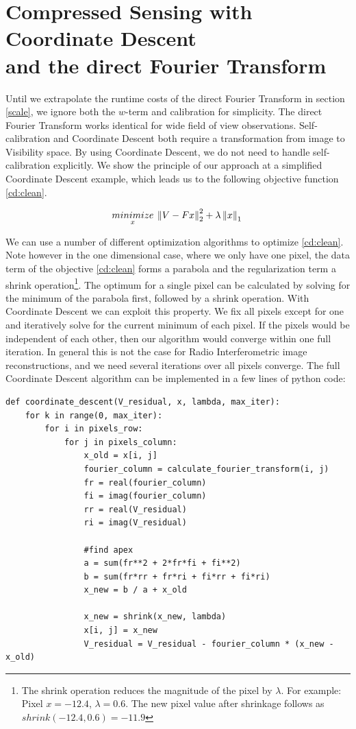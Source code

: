 \section{Compressed Sensing with Coordinate Descent\\ and the direct Fourier Transform}\label{cd}
Until we extrapolate the runtime costs of the direct Fourier Transform in section \ref{scale}, we ignore both the $w$-term and calibration for simplicity. The direct Fourier Transform works identical for wide field of view observations. Self-calibration and Coordinate Descent both require a transformation from image to Visibility space. By using Coordinate Descent, we do not need to handle self-calibration explicitly. We show the principle of our approach at a simplified Coordinate Descent example, which leads us to the following objective function \eqref{cd:clean}.

\begin{equation}\label{cd:clean}
\underset{x}{minimize} \: \left \| V - Fx \right \|_2^2 + \lambda \left \| x \right \|_1 \\
\end{equation}

We can use a number of different optimization algorithms to optimize \eqref{cd:clean}. Note however in the one dimensional case, where we only have one pixel, the data term of the objective \eqref{cd:clean} forms a parabola and the regularization term a shrink operation\footnote{The shrink operation reduces the magnitude of the pixel by $\lambda$. For example: Pixel $x = -12.4$, $\lambda = 0.6$. The new pixel value after shrinkage follows as $shrink(-12.4, 0.6) = -11.9$}. The optimum for a single pixel can be calculated by solving for the minimum of the parabola first, followed by a shrink operation. With Coordinate Descent we can exploit this property. We fix all pixels except for one and iteratively solve for the current minimum of each pixel. If the pixels would be independent of each other, then our algorithm would converge within one full iteration. In general this is not the case for Radio Interferometric image reconstructions, and we need several iterations over all pixels converge. The full Coordinate Descent algorithm can be implemented in a few lines of python code:

\begin{lstlisting} 
def coordinate_descent(V_residual, x, lambda, max_iter):
	for k in range(0, max_iter):
		for i in pixels_row:
			for j in pixels_column:
				x_old = x[i, j]
				fourier_column = calculate_fourier_transform(i, j)
				fr = real(fourier_column)
				fi = imag(fourier_column)
				rr = real(V_residual)
				ri = imag(V_residual)
				
				#find apex
				a = sum(fr**2 + 2*fr*fi + fi**2)
				b = sum(fr*rr + fr*ri + fi*rr + fi*ri)
				x_new = b / a + x_old
				
				x_new = shrink(x_new, lambda)
				x[i, j] = x_new
				V_residual = V_residual - fourier_column * (x_new - x_old)
\end{lstlisting}\label{cd:basic}

